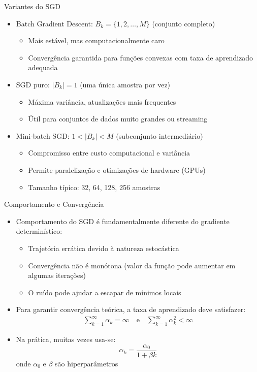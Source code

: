 \documentclass[aspectratio=1610]{beamer}
\begin{document}
\begin{frame}{Variantes do SGD}
\begin{itemize}
    \item Batch Gradient Descent: $B_k = \{1, 2, \ldots, M\}$ (conjunto completo) \pause
    \begin{itemize}
        \item Mais estável, mas computacionalmente caro \pause
        \item Convergência garantida para funções convexas com taxa de aprendizado adequada
    \end{itemize} \pause
    \item SGD puro: $|B_k| = 1$ (uma única amostra por vez) \pause
    \begin{itemize}
        \item Máxima variância, atualizações mais frequentes \pause
        \item Útil para conjuntos de dados muito grandes ou streaming
    \end{itemize} \pause
    \item Mini-batch SGD: $1 < |B_k| < M$ (subconjunto intermediário) \pause
    \begin{itemize}
        \item Compromisso entre custo computacional e variância \pause
        \item Permite paralelização e otimizações de hardware (GPUs) \pause
        \item Tamanho típico: 32, 64, 128, 256 amostras
    \end{itemize}
\end{itemize}
\end{frame}

\begin{frame}{Comportamento e Convergência}
\begin{itemize}
    \item Comportamento do SGD é fundamentalmente diferente do gradiente determinístico: \pause
    \begin{itemize}
        \item Trajetória errática devido à natureza estocástica \pause
        \item Convergência não é monótona (valor da função pode aumentar em algumas iterações) \pause
        \item O ruído pode ajudar a escapar de mínimos locais
    \end{itemize} \pause
    \item Para garantir convergência teórica, a taxa de aprendizado deve satisfazer: \pause
    \begin{gather*}
        \sum_{k=1}^{\infty} \alpha_k = \infty \quad \text{e} \quad \sum_{k=1}^{\infty} \alpha_k^2 < \infty
    \end{gather*} \pause
    \item Na prática, muitas vezes usa-se: \pause
    \begin{equation*}
        \alpha_k = \frac{\alpha_0}{1 + \beta k}
    \end{equation*}
    onde $\alpha_0$ e $\beta$ são hiperparâmetros
\end{itemize}
\end{frame}
\end{document}
